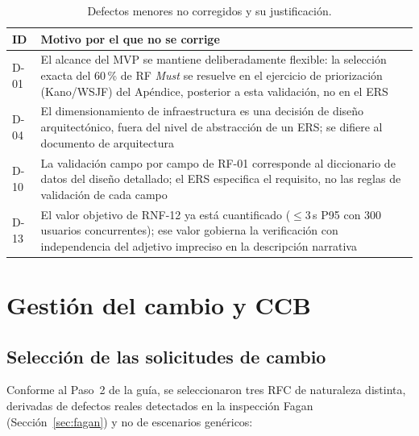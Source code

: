 \documentclass[journal,onecolumn]{IEEEtran}
\begin{document}
	\begin{table}[H]
		\centering
		\caption{Defectos menores no corregidos y su justificación.}
		\label{tab:defectos-no-corregidos}
		\small
		\begin{tabularx}{\textwidth}{@{}l X@{}}
			\toprule
			\textbf{ID} & \textbf{Motivo por el que no se corrige} \\
			\midrule
			D-01 & El alcance del MVP se mantiene deliberadamente flexible: la selección exacta del 60\,\% de RF \emph{Must} se resuelve en el ejercicio de priorización (Kano/WSJF) del Apéndice, posterior a esta validación, no en el ERS \\
			D-04 & El dimensionamiento de infraestructura es una decisión de diseño arquitectónico, fuera del nivel de abstracción de un ERS; se difiere al documento de arquitectura \\
			D-10 & La validación campo por campo de RF-01 corresponde al diccionario de datos del diseño detallado; el ERS especifica el requisito, no las reglas de validación de cada campo \\
			D-13 & El valor objetivo de RNF-12 ya está cuantificado ($\leq$3\,s P95 con 300 usuarios concurrentes); ese valor gobierna la verificación con independencia del adjetivo impreciso en la descripción narrativa \\
			\bottomrule
		\end{tabularx}
	\end{table}
	
	\section{Gestión del cambio y CCB}
	\label{sec:ccb}
	
	\subsection{Selección de las solicitudes de cambio}
	
	Conforme al Paso~2 de la guía, se seleccionaron tres RFC de
	naturaleza distinta, derivadas de defectos reales detectados en la
	inspección Fagan (Sección~\ref{sec:fagan}) y no de escenarios
	genéricos:
	
\end{document}
